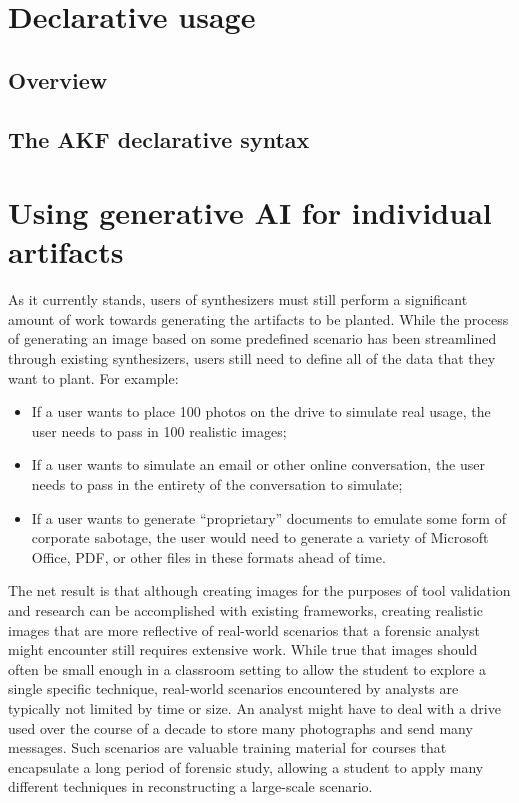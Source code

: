 \documentclass[letterpaper,12pt]{report}
\def\tightlist{}
\begin{document}
\section{Declarative usage}\label{declarative-usage}

\subsection{Overview}\label{overview}

\subsection{The AKF declarative
syntax}\label{the-akf-declarative-syntax}

\section{Using generative AI for individual
artifacts}\label{using-generative-ai-for-individual-artifacts}

As it currently stands, users of synthesizers must still perform a
significant amount of work towards generating the artifacts to be
planted. While the process of generating an image based on some
predefined scenario has been streamlined through existing synthesizers,
users still need to define all of the data that they want to plant. For
example:

\begin{itemize}
\tightlist
\item
  If a user wants to place 100 photos on the drive to simulate real
  usage, the user needs to pass in 100 realistic images;
\item
  If a user wants to simulate an email or other online conversation, the
  user needs to pass in the entirety of the conversation to simulate;
\item
  If a user wants to generate ``proprietary'' documents to emulate some
  form of corporate sabotage, the user would need to generate a variety
  of Microsoft Office, PDF, or other files in these formats ahead of
  time.
\end{itemize}

The net result is that although creating images for the purposes of tool
validation and research can be accomplished with existing frameworks,
creating realistic images that are more reflective of real-world
scenarios that a forensic analyst might encounter still requires
extensive work. While true that images should often be small enough in a
classroom setting to allow the student to explore a single specific
technique, real-world scenarios encountered by analysts are typically
not limited by time or size. An analyst might have to deal with a drive
used over the course of a decade to store many photographs and send many
messages. Such scenarios are valuable training material for courses that
encapsulate a long period of forensic study, allowing a student to apply
many different techniques in reconstructing a large-scale scenario.
\end{document}
